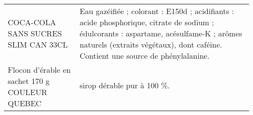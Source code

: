 \begin{longtable}{p{5cm}p{10cm}}
                                                                      COCA-COLA SANS SUCRES SLIM CAN 33CL &                                                                                                                                                                                                                                                                                                                                                                                                                                                                                                                                                                                                                                                                                                                                                                                                               Eau gazéifiée ; colorant : E150d ; acidifiants : acide phosphorique, citrate de sodium ; édulcorants : aspartame, acésulfame-K ; arômes naturels (extraits végétaux), dont caféine.  Contient une source de phénylalanine. \\
                                                           Flocon d'érable en sachet 170 g COULEUR QUEBEC &                                                                                                                                                                                                                                                                                                                                                                                                                                                                                                                                                                                                                                                                                                                                                                                                                                                                                                                                                                                                              sirop dérable pur à 100 \%. \\

\end{longtable}
